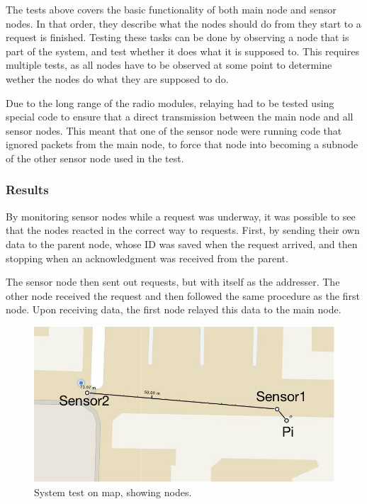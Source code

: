 The tests above covers the basic functionality of both main node and sensor nodes. In that order, they describe what the nodes should do from they start to a request is finished.
Testing these tasks can be done by observing a node that is part of the system, and test whether it does what it is supposed to. This requires multiple tests, as all nodes have to be observed at some point to determine wether the nodes do what they are supposed to do.

Due to the long range of the radio modules, relaying had to be tested using special code to ensure that a direct transmission between the main node and all sensor nodes. This meant that one of the sensor node were running code that ignored packets from the main node, to force that node into becoming a subnode of the other sensor node used in the test.

\subsubsection*{Results}
By monitoring sensor nodes while a request was underway, it was possible to see that the nodes reacted in the correct way to requests. First, by sending their own data to the parent node, whose ID was saved when the request arrived, and then stopping when an acknowledgment was received from the parent.

The sensor node then sent out requests, but with itself as the addresser. The other node received the request and then followed the same procedure as the first node. Upon receiving data, the first node relayed this data to the main node.

\begin{figure}[h!]
\centering
\includegraphics[width=1\textwidth]{chapters/test/figures/systest.png}
\caption{System test on map, showing nodes.}
\label{fig:systest}
\end{figure}


